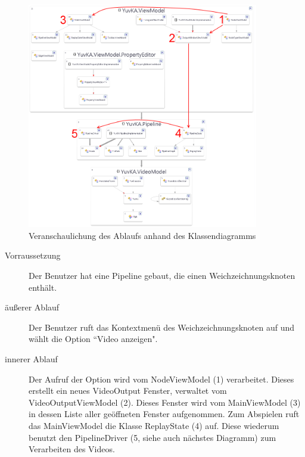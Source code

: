 \begin{figure}[h!]
\begin{center}
\includegraphics[width=0.9\textwidth]{Diagrams/visualization_TC2.png}
\end{center}
\caption{Veranschaulichung des Ablaufs anhand des Klassendiagramms}
\end{figure}
\begin{description}
	\item[Vorraussetzung] Der Benutzer hat eine Pipeline gebaut, die einen Weichzeichnungsknoten enthält.
	\item[äußerer Ablauf] Der Benutzer ruft das Kontextmenü des Weichzeichnungsknoten auf und wählt die Option ``Video anzeigen".
	\item[innerer Ablauf] Der Aufruf der Option wird vom NodeViewModel (1) verarbeitet. Dieses erstellt ein neues VideoOutput Fenster, verwaltet vom VideoOutputViewModel (2). Dieses Fenster wird vom MainViewModel (3) in dessen Liste aller geöffneten Fenster aufgenommen. Zum Abspielen ruft das MainViewModel die Klasse ReplayState (4) auf. Diese wiederum benutzt den PipelineDriver (5, siehe auch nächstes Diagramm) zum Verarbeiten des Videos.
\end{description}
\newpage
